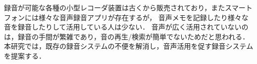 \begin{jabstract}
録音が可能な各種の小型レコーダ装置は古くから販売されており，またスマートフォンには様々な音声録音アプリが存在するが，
音声メモを記録したり様々な音を録音したりして活用している人は少ない．
音声が広く活用されていないのは，録音の手間が繁雑であり，音の再生/検索が簡単でないためだと思われる．
本研究では，既存の録音システムの不便を解消し，音声活用を促す録音システムを提案する．
\end{jabstract}

